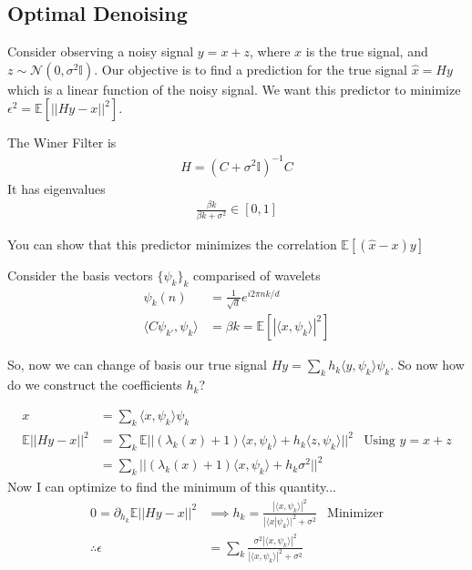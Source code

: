 \subsection{Optimal Denoising}
Consider observing a noisy signal $y = x + z$, where $x$ is the true signal, and $z \sim \mathcal N(0, \sigma^2 \mathbb I)$. Our objective is to find a prediction for the true signal $\hat x = H y$ which is a linear function of the noisy signal. We want this predictor to minimize $\epsilon^2 = \mathbb E[|| H y - x ||^2]$.
\begin{theorem}
	 The Winer Filter is
	\begin{align}
		H = (C + \sigma^2 \mathbb I)^{-1}C
	\end{align}
	It has eigenvalues \begin{align}
		\frac{\beta k}{\beta k + \sigma^2} \in [0,1]
	\end{align}
	
	You can show that this predictor minimizes the correlation $\mathbb E[(\hat x - x) y]$
\end{theorem}
\begin{definition}
	 Consider the basis vectors $\{\psi_k\}_k$ comparised of wavelets
	\begin{align}
	\psi_k(n) & = \frac{1}{\sqrt{d}} e^{i 2\pi n k/d}\\
	\langle C \psi_{k'}, \psi_k\rangle & = \beta k = \mathbb E[|\langle x, \psi_k \rangle|^2]
	\end{align}
	
\end{definition}
So, now we can change of basis our true signal $H y = \sum_k h_k \langle y, \psi_k\rangle \psi_k$. So now how do we construct the coefficients $h_k$?

\begin{align}
	x & = \sum_k \langle x, \psi_k \rangle \psi_k\\
	\mathbb E ||Hy - x ||^2 & =  \sum_k \mathbb E \Big| \Big | (\lambda_k(x)  + 1) \langle x, \psi_k \rangle + h_k \langle z, \psi_k \rangle \Big| \Big|^2 & \text{Using } y = x + z\\
	& =  \sum_k  \Big| \Big | (\lambda_k(x)  + 1) \langle x, \psi_k \rangle + h_k \sigma^2 \Big| \Big|^2
\end{align}
Now I can optimize to find the minimum of this quantity...
\begin{align}
	0 = \partial_{h_k} \mathbb E ||Hy - x ||^2 &  \implies h_k = \frac{|\langle x, \psi_k \rangle|^2}{|\langle x | \psi_k\rangle|^2 + \sigma^2} & \text{Minimizer}\\
	\therefore \epsilon & = \sum_k \frac{ \sigma^2 |\langle x, \psi_k \rangle|^2}{|\langle x, \psi_k \rangle|^2 + \sigma^2}
\end{align}

